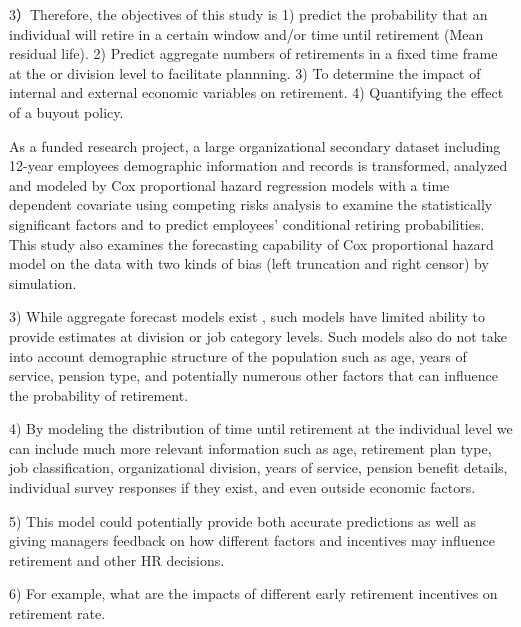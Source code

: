 \documentclass[12pt,letterpaper]{article}
\begin{document}
3）Therefore, the objectives of this study is
	1) predict the probability that an individual will retire in a certain window and/or time until retirement (Mean residual life).
	2) Predict aggregate numbers of retirements in a fixed time frame at the or division level to facilitate plannning.
	3) To determine the impact of internal and external economic variables on retirement.
	4) Quantifying the effect of a buyout policy.

As a funded research project, a large organizational secondary dataset including 12-year employees demographic information and records is transformed, analyzed and modeled by Cox proportional hazard regression models with a time dependent covariate using competing risks analysis to examine the statistically significant factors and to predict employees' conditional retiring probabilities. This study also examines the forecasting capability of Cox proportional hazard model on the data with two kinds of bias (left truncation and right censor) by simulation.

3) While aggregate forecast models exist \citep{zhu2015}, such models have limited ability to provide estimates at division or job category levels.  Such models also do not take into account demographic structure of the population such as age, years of service, pension type, and potentially numerous other factors that can influence the probability of retirement.

4) By modeling the distribution of time until retirement at the individual level we can include much more relevant information such as age, retirement plan type, job classification, organizational division, years of service, pension benefit details, individual survey responses if they exist, and even outside economic factors.  

5) This model could potentially provide both accurate predictions as well as giving managers feedback on how different factors and incentives may influence retirement and other HR decisions.

6) For example, what are the impacts  of different early retirement incentives on retirement rate.  


\end{document}
